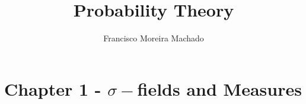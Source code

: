\documentclass{scrartcl}
\author{Francisco Moreira Machado}
\title{Probability Theory}
\begin{document}
  \maketitle
  \section{Chapter 1 - $\sigma-$fields and Measures}
  
  
  
  
  
  
  
  
  
  
  
  
  
  
  
  
  
  
\end{document}
